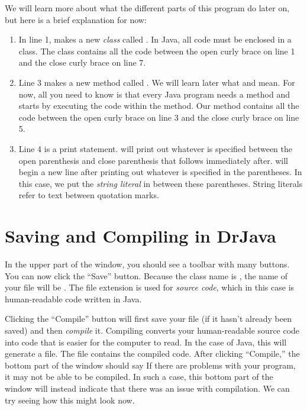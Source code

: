 We will learn more about what the different parts of this program do later on, but here is a brief explanation for now:
\begin{enumerate}
\item In line 1,  makes a new \emph{class} called . In Java, all code must be enclosed in a class. The class contains all the code between the open curly brace \ic{\{} on line 1 and the close curly brace \ic{\}} on line 7.
\item Line 3 makes a new method called . We will learn later what
 and  mean. For now, all you
need to know is that every Java program needs a  method and starts
by executing the code within the  method. Our  method
contains all the code between the open curly brace \ic{\{} on line 3 and the
close curly brace \ic{\}} on line 5.
\item Line 4 is a print statement.  will print out
whatever is specified between the open parenthesis \ic{(} and close
parenthesis\ic{)} that follows immediately after.
 will begin a new line after printing out whatever is specified in the parentheses.
In this case, we
put the \emph{string literal}  in between these parentheses.
String literals refer to text between quotation marks.
\end{enumerate}


\section{Saving and Compiling in DrJava}

In the upper part of the window, you should see a toolbar with many buttons.
You can now click the ``Save'' button.
Because the class name is , the name of your file will be
. The  file extension is used for
\emph{source code}, which in this case is human-readable code written in Java.

Clicking the ``Compile'' button will first save your file (if it hasn't already been saved) and then \emph{compile} it. Compiling converts your human-readable
source code into code that is easier for the computer to read.
In the case of Java, this will generate a  file. The
 file contains the compiled code.
After clicking ``Compile,'' the bottom part of the window should say
 If there are problems with your program, it may not be able to be compiled. In such a case, this bottom part of the window will instead indicate that there was an issue with compilation.
We can try seeing how this might look now.

